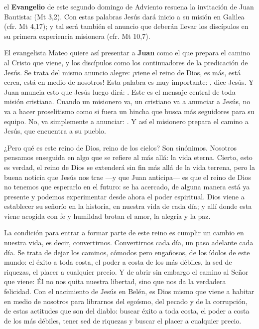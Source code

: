 \begin{body}
	 el \textbf{Evangelio} de este segundo domingo de Adviento resuena la invitación de Juan Bautista:  (Mt 3,2). Con estas palabras Jesús dará inicio a su misión en Galilea (cfr. Mt 4,17); y tal será también el anuncio que deberán llevar los discípulos en su primera experiencia misionera (cfr. Mt 10,7).
	
	El evangelista Mateo quiere así presentar a \textbf{Juan} como el que prepara el camino al Cristo que viene, y los discípulos como los continuadores de la predicación de Jesús. Se trata del mismo anuncio alegre: ¡viene el reino de Dios, es más, está cerca, está en medio de nosotros! Esta palabra es muy importante: , dice Jesús. Y Juan anuncia esto que Jesús luego dirá: . Este es el mensaje central de toda misión cristiana. Cuando un misionero va, un cristiano va a anunciar a Jesús, no va a hacer proselitismo como si fuera un hincha que busca más seguidores para su equipo. No, va simplemente a anunciar: . Y así el misionero prepara el camino a Jesús, que encuentra a su pueblo.
	
	¿Pero qué es este reino de Dios, reino de los cielos? Son sinónimos. Nosotros pensamos enseguida en algo que se refiere al más allá: la vida eterna. Cierto, esto es verdad, el reino de Dios se extenderá sin fin más allá de la vida terrena, pero la buena noticia que Jesús nos trae ---y que Juan anticipa--- es que el reino de Dios no tenemos que esperarlo en el futuro: se ha acercado, de alguna manera está ya presente y podemos experimentar desde ahora el poder espiritual. Dios viene a establecer su señorío en la historia, en nuestra vida de cada día; y allí donde esta viene acogida con fe y humildad brotan el amor, la alegría y la paz.
	
	La condición para entrar a formar parte de este reino es cumplir un cambio en nuestra vida, es decir, convertirnos. Convertirnos cada día, un paso adelante cada día. Se trata de dejar los caminos, cómodos pero engañosos, de los ídolos de este mundo: el éxito a toda costa, el poder a costa de los más débiles, la sed de riquezas, el placer a cualquier precio. Y de abrir sin embargo el camino al Señor que viene: Él no nos quita nuestra libertad, sino que nos da la verdadera felicidad. Con el nacimiento de Jesús en Belén, es Dios mismo que viene a habitar en medio de nosotros para librarnos del egoísmo, del pecado y de la corrupción, de estas actitudes que son del diablo: buscar éxito a toda costa, el poder a costa de los más débiles, tener sed de riquezas y buscar el placer a cualquier precio.
	

\end{body}
